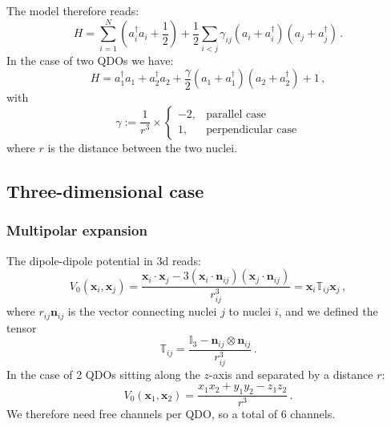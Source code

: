 \documentclass[reprint, amsmath, amssymb, aps]{revtex4-2}
\begin{document}
        The model therefore reads:
        \begin{equation}
        \label{eq:hamiltonian_N_qdos}
            H = \sum_{i=1}^N\left(a_i^\dagger a_i+\frac{1}{2}\right) + \frac{1}{2}\sum_{i<j}\gamma_{ij}\left(a_i+a_i^\dagger\right)\left(a_j+a_j^\dagger\right)\,.
        \end{equation}
        In the case of two QDOs we have:
        \begin{equation}
            H = a_1^\dagger a_1 + a_2^\dagger a_2 + \frac{\gamma}{2}\left(a_1+a_1^\dagger\right)\left(a_2+a_2^\dagger\right) + 1\,,
        \end{equation}
        with
        \begin{equation}
            \gamma := \frac{1}{r^3}\times
            \begin{cases}
                -2, & \text{parallel case} \\
                1, & \text{perpendicular case}
            \end{cases}
        \end{equation}
        where $r$ is the distance between the two nuclei.



    \subsection{Three-dimensional case}

        \subsubsection{Multipolar expansion}

            The dipole-dipole potential in 3d reads:
            \begin{equation}
                V_0(\bm{x} _i, \bm{x} _j) = \frac{\bm{x} _i\cdot \bm{x} _j - 3 (\bm{x} _i\cdot \bm{n} _{ij})(\bm{x} _j\cdot \bm{n} _{ij})}{r_{ij}^3}=\bm{x} _i \mathbb T_{ij} \bm{x} _j\,,
            \end{equation}
            where $r_{ij}\bm{n} _{ij}$ is the vector connecting nuclei $j$ to nuclei $i$, and we defined the tensor
            \begin{equation}
                \mathbb T_{ij} = \frac{\mathbb I_3 - \bm{n} _{ij}\otimes\bm{n} _{ij}}{r_{ij}^3}\,.
            \end{equation}
            In the case of 2 QDOs sitting along the $z$-axis and separated by a distance $r$:
            \begin{equation}
                V_0(\bm{x} _1, \bm{x} _2) = \frac{x_1x_2 + y_1y_2 - z_1z_2}{r^3}\,.
            \end{equation}
            We therefore need free channels per QDO, so a total of 6 channels.
\end{document}
